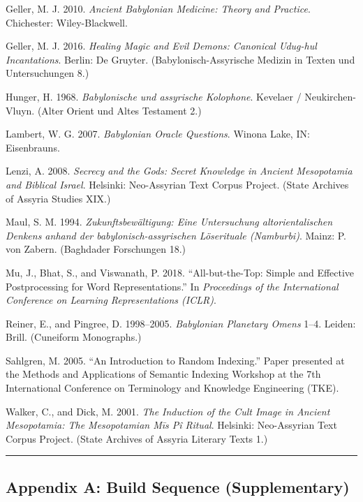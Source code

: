 \documentclass[
  11pt,
  letterpaper,
]{article}
\begin{document}
Geller, M. J. 2010. \emph{Ancient Babylonian Medicine: Theory and
Practice}. Chichester: Wiley-Blackwell.

Geller, M. J. 2016. \emph{Healing Magic and Evil Demons: Canonical
Udug-hul Incantations}. Berlin: De Gruyter. (Babylonisch-Assyrische
Medizin in Texten und Untersuchungen 8.)

Hunger, H. 1968. \emph{Babylonische und assyrische Kolophone}. Kevelaer
/ Neukirchen-Vluyn. (Alter Orient und Altes Testament 2.)

Lambert, W. G. 2007. \emph{Babylonian Oracle Questions}. Winona Lake,
IN: Eisenbrauns.

Lenzi, A. 2008. \emph{Secrecy and the Gods: Secret Knowledge in Ancient
Mesopotamia and Biblical Israel}. Helsinki: Neo-Assyrian Text Corpus
Project. (State Archives of Assyria Studies XIX.)

Maul, S. M. 1994. \emph{Zukunftsbewältigung: Eine Untersuchung
altorientalischen Denkens anhand der babylonisch-assyrischen Löserituale
(Namburbi)}. Mainz: P. von Zabern. (Baghdader Forschungen 18.)

Mu, J., Bhat, S., and Viswanath, P. 2018. ``All-but-the-Top: Simple and
Effective Postprocessing for Word Representations.'' In
\emph{Proceedings of the International Conference on Learning
Representations (ICLR)}.

Reiner, E., and Pingree, D. 1998--2005. \emph{Babylonian Planetary
Omens} 1--4. Leiden: Brill. (Cuneiform Monographs.)

Sahlgren, M. 2005. ``An Introduction to Random Indexing.'' Paper
presented at the Methods and Applications of Semantic Indexing Workshop
at the 7th International Conference on Terminology and Knowledge
Engineering (TKE).

Walker, C., and Dick, M. 2001. \emph{The Induction of the Cult Image in
Ancient Mesopotamia: The Mesopotamian Mīs Pî Ritual}. Helsinki:
Neo-Assyrian Text Corpus Project. (State Archives of Assyria Literary
Texts 1.)

\begin{center}\rule{0.5\linewidth}{0.5pt}\end{center}

\subsection{Appendix A: Build Sequence
(Supplementary)}\label{appendix-a-build-sequence-supplementary}
\end{document}
